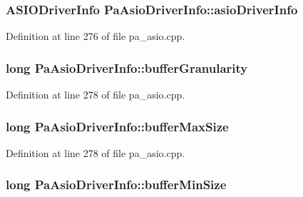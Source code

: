 \subsubsection[{\texorpdfstring{asio\+Driver\+Info}{asioDriverInfo}}]{\setlength{\rightskip}{0pt plus 5cm}A\+S\+I\+O\+Driver\+Info Pa\+Asio\+Driver\+Info\+::asio\+Driver\+Info}\hypertarget{struct_pa_asio_driver_info_ac27f7fa26c857dc5a9e92448c57f57cd}{}\label{struct_pa_asio_driver_info_ac27f7fa26c857dc5a9e92448c57f57cd}


Definition at line 276 of file pa\+\_\+asio.\+cpp.

\subsubsection[{\texorpdfstring{buffer\+Granularity}{bufferGranularity}}]{\setlength{\rightskip}{0pt plus 5cm}long Pa\+Asio\+Driver\+Info\+::buffer\+Granularity}\hypertarget{struct_pa_asio_driver_info_a472b26aa53958e911d3cd61edeb2c6d9}{}\label{struct_pa_asio_driver_info_a472b26aa53958e911d3cd61edeb2c6d9}


Definition at line 278 of file pa\+\_\+asio.\+cpp.

\subsubsection[{\texorpdfstring{buffer\+Max\+Size}{bufferMaxSize}}]{\setlength{\rightskip}{0pt plus 5cm}long Pa\+Asio\+Driver\+Info\+::buffer\+Max\+Size}\hypertarget{struct_pa_asio_driver_info_a5742e81d8d2a285a000686b166cd00d4}{}\label{struct_pa_asio_driver_info_a5742e81d8d2a285a000686b166cd00d4}


Definition at line 278 of file pa\+\_\+asio.\+cpp.

\subsubsection[{\texorpdfstring{buffer\+Min\+Size}{bufferMinSize}}]{\setlength{\rightskip}{0pt plus 5cm}long Pa\+Asio\+Driver\+Info\+::buffer\+Min\+Size}\hypertarget{struct_pa_asio_driver_info_a316045d2b43b71ec8bbd0d094c12b08a}{}\label{struct_pa_asio_driver_info_a316045d2b43b71ec8bbd0d094c12b08a}



